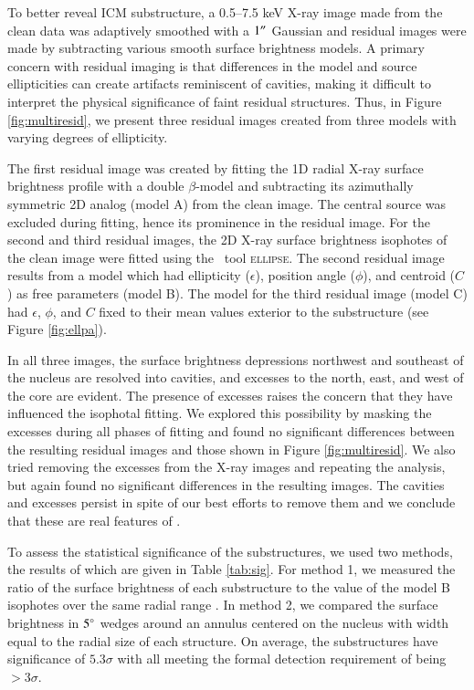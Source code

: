 \documentclass[referee,traditabstract]{aa}
\begin{document}
To better reveal ICM substructure, a 0.5--7.5 keV X-ray image made
from the clean data was adaptively smoothed with a $1\rm{^\prime}\hskip -0.1em\rm{^\prime}$ Gaussian
and residual images were made by subtracting various smooth surface
brightness models. A primary concern with residual imaging is that
differences in the model and source ellipticities can create artifacts
reminiscent of cavities, making it difficult to interpret the physical
significance of faint residual structures. Thus, in Figure
\ref{fig:multiresid}, we present three residual images created from
three models with varying degrees of ellipticity.

The first residual image was created by fitting the 1D radial X-ray
surface brightness profile with a double $\beta$-model
\citep{betamodel} and subtracting its azimuthally symmetric 2D analog
(model A) from the clean image. The central source was excluded during
fitting, hence its prominence in the residual image. For the second
and third residual images, the 2D X-ray surface brightness isophotes
of the clean image were fitted using the \iraf\ tool
\textsc{ellipse}. The second residual image results from a model which
had ellipticity ($\epsilon$), position angle ($\phi$), and centroid
($C$) as free parameters (model B). The model for the third residual
image (model C) had $\epsilon$, $\phi$, and $C$ fixed to their mean
values exterior to the substructure (see Figure \ref{fig:ellpa}).

In all three images, the surface brightness depressions northwest and
southeast of the nucleus are resolved into cavities, and excesses to
the north, east, and west of the core are evident. The presence of
excesses raises the concern that they have influenced the isophotal
fitting. We explored this possibility by masking the excesses during
all phases of fitting and found no significant differences between the
resulting residual images and those shown in Figure
\ref{fig:multiresid}. We also tried removing the excesses from the
X-ray images and repeating the analysis, but again found no
significant differences in the resulting images. The cavities and
excesses persist in spite of our best efforts to remove them and we
conclude that these are real features of \irs.

To assess the statistical significance of the substructures, we used
two methods, the results of which are given in Table
\ref{tab:sig}. For method 1, we measured the ratio of the surface
brightness of each substructure to the value of the model B isophotes
over the same radial range \citep[see][for a similar
  approach]{hydraa}. In method 2, we compared the surface brightness
in $5\rm{^{\circ}}$ wedges around an annulus centered on the nucleus with
width equal to the radial size of each structure. On average, the
substructures have significance of $5.3\sigma$ with all meeting the
formal detection requirement of being $>3\sigma$.
\end{document}
